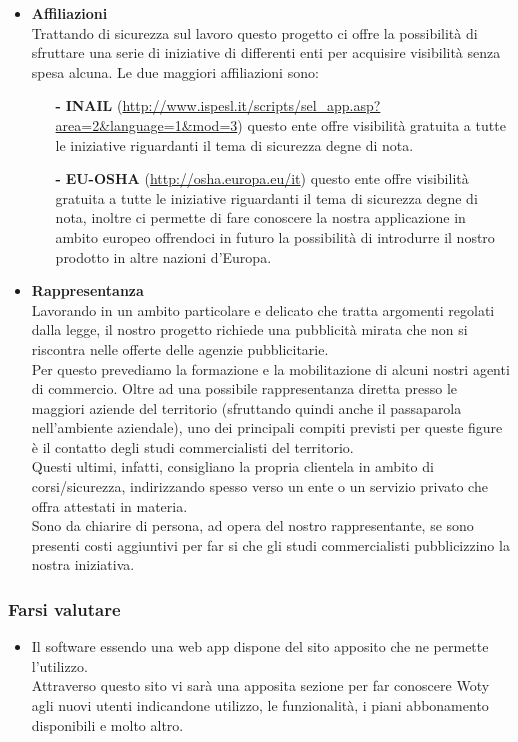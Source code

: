 \begin{itemize}
\item \textbf{Affiliazioni}\\
Trattando di sicurezza sul lavoro questo progetto ci offre la possibilità di sfruttare una serie di iniziative di
differenti enti per acquisire visibilità senza spesa alcuna.
Le due maggiori affiliazioni sono:

\begin{itemize}
	\item[\textbf{-}] \textbf{INAIL} (\url{http://www.ispesl.it/scripts/sel_app.asp?area=2&language=1&mod=3}) questo ente offre visibilità gratuita a tutte le iniziative riguardanti il tema di sicurezza degne di nota.

	\item[\textbf{-}] \textbf{EU-OSHA} (\url{http://osha.europa.eu/it}) questo ente offre visibilità gratuita a tutte le iniziative riguardanti il tema di sicurezza degne di nota, inoltre ci permette di fare conoscere la nostra applicazione in ambito europeo offrendoci in futuro la possibilità di introdurre il nostro prodotto in altre nazioni d'Europa.

\end{itemize}

\item \textbf{Rappresentanza}\\
Lavorando in un ambito particolare e delicato che tratta argomenti regolati dalla legge, il nostro progetto richiede una pubblicità mirata che non si riscontra nelle offerte delle agenzie pubblicitarie.\\ Per questo prevediamo la formazione e la mobilitazione di alcuni nostri agenti di commercio. Oltre ad una possibile rappresentanza diretta presso le maggiori aziende del territorio (sfruttando quindi anche il passaparola nell'ambiente aziendale), uno dei principali compiti previsti per queste figure è il contatto degli studi commercialisti del territorio.\\ Questi ultimi, infatti, consigliano la propria clientela in ambito di corsi/sicurezza, indirizzando spesso verso un ente o un servizio privato che offra attestati in materia.\\ Sono da chiarire di persona, ad opera del nostro rappresentante, se sono presenti costi aggiuntivi per far si che gli studi commercialisti pubblicizzino la nostra iniziativa.

\end{itemize}

\subsubsection{Farsi valutare}
\begin{itemize}
\item Il software essendo una web app dispone del sito apposito che ne permette l'utilizzo.\\
Attraverso questo sito vi sarà una apposita sezione per far conoscere Woty agli nuovi utenti indicandone utilizzo, le funzionalità, i piani abbonamento disponibili e molto altro.
\end{itemize}

